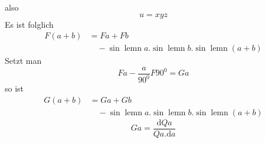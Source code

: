 also
\[
u=xyz
\]
Es ist folglich
\[
\begin{aligned}F(a+b)&=Fa+Fb\\[7pt]&\quad{}-\sin\operatorname{lemn}a.\sin\operatorname{lemn}b.\sin\operatorname{lemn}(a+b)\end{aligned}
\]
Setzt man
\[
Fa-\frac{a}{90^0}F90^0=Ga
\]
so ist
\[
\begin{aligned}G(a+b)&=Ga+Gb\\[7pt]&\quad{}-\sin\operatorname{lemn}a.\sin\operatorname{lemn}b.\sin\operatorname{lemn}(a+b)\end{aligned}
\]
\[
Ga=\frac{\mathrm dQa}{Qa.\mathrm da}
\]

\clearpage
\endgroup
